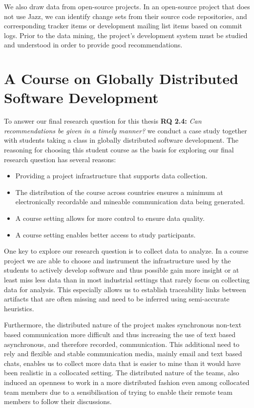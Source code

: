 We also draw data from open-source projects. 
In an open-source project that does not use Jazz, we can identify change sets from their source code repositories, and corresponding tracker items or development mailing list items based on commit logs. 
Prior to the data mining, the project's development system must be studied and understood in order to provide good recommendations.

\section{A Course on Globally Distributed Software Development}
To answer our final research question for this thesis \textbf{RQ 2.4:} \emph{Can recommendations be given in a timely manner?} we conduct a case study together with students taking a class in globally distributed software development.
The reasoning for choosing this student course as the basis for exploring our final research question has several reasons:
\begin{itemize}
\item Providing a project infrastructure that supports data collection.
\item The distribution of the course across countries ensures a minimum at electronically recordable and mineable communication data being generated.
\item A course setting allows for more control to ensure data quality.
\item A course setting enables better access to study participants.
\end{itemize}

One key to explore our research question is to collect data to analyze.
In a course project we are able to choose and instrument the infrastructure used by the students to actively develop software and thus possible gain more insight or at least miss less data than in most industrial settings that rarely focus on collecting data for analysis.
This especially allows us to establish traceability links between artifacts that are often missing and need to be inferred using semi-accurate heuristics.

Furthermore, the distributed nature of the project makes synchronous non-text based communication more difficult and thus increasing the use of text based asynchronous, and therefore recorded, communication.
This additional need to rely and flexible and stable communication media, mainly email and text based chats, enables us to collect more data that is easier to mine than it would have been realistic in a collocated setting.
The distributed nature of the teams, also induced an openness to work in a more distributed fashion even among collocated team members due to a sensibilisation of trying to enable their remote team members to follow their discussions.

